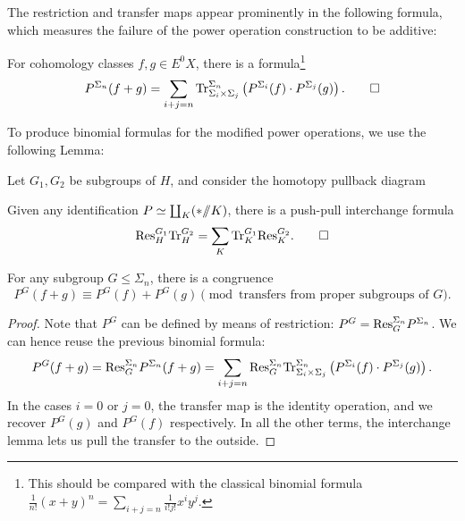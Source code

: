 The restriction and transfer maps appear prominently in the following formula, which measures the failure of the power operation construction to be additive:
\begin{lemma}
For cohomology classes $f, g \in E^0 X$, there is a formula\footnote{This should be compared with the classical binomial formula $\frac{1}{n!} (x + y)^n = \sum_{i+j = n} \frac{1}{i!j!} x^i y^j$.} \[P^{\Sigma_n}(f + g) = \sum_{i + j = n} \mathrm{Tr}_{\Sigma_i \times \Sigma_j}^{\Sigma_n}\left(P^{\Sigma_i}(f) \cdot P^{\Sigma_j}(g)\right). \qed\]
\end{lemma}

\noindent To produce binomial formulas for the modified power operations, we use the following Lemma:

\begin{lemma}
Let $G_1, G_2$ be subgroups of $H$, and consider the homotopy pullback diagram
\begin{center}
\end{center}
Given any identification $P \simeq \coprod_K (* /\!\!/ K)$, there is a push-pull interchange formula \[\mathrm{Res}^{G_1}_H \mathrm{Tr}_H^{G_2} = \sum_K \mathrm{Tr}^{G_1}_K \mathrm{Res}_K^{G_2}. \qed\]
\end{lemma}

\begin{corollary}
For any subgroup $G \le \Sigma_n$, there is a congruence \[P^G(f + g) \equiv P^G(f) + P^G(g) \pmod{\text{transfers from proper subgroups of $G$}}.\]
\end{corollary}
\begin{proof}
Note that $P^G$ can be defined by means of restriction: $P^G = \mathrm{Res}^{\Sigma_n}_G P^{\Sigma_n}$.  We can hence reuse the previous binomial formula: \[P^G(f + g) = \mathrm{Res}^{\Sigma_n}_G P^{\Sigma_n}(f + g) = \sum_{i+j = n} \mathrm{Res}^{\Sigma_n}_G \mathrm{Tr}_{\Sigma_i \times \Sigma_j}^{\Sigma_n}\left(P^{\Sigma_i}(f) \cdot P^{\Sigma_j}(g)\right).\]  In the cases $i = 0$ or $j = 0$, the transfer map is the identity operation, and we recover $P^G(g)$ and $P^G(f)$ respectively.  In all the other terms, the interchange lemma lets us pull the transfer to the outside.
\end{proof}

